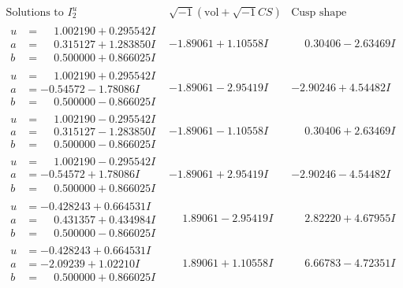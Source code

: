 \documentclass[1p]{elsarticle_modified}
\theoremstyle{definition}
\newcommand{\I}{\sqrt{-1}}
\begin{document}
$$\begin{array}{c|c|c}  
\text{Solutions to }I^u_{2}& \I (\text{vol} + \sqrt{-1}CS) & \text{Cusp shape}\\
 \hline 
\begin{aligned}
u &= \phantom{-}1.002190 + 0.295542 I \\
a &= \phantom{-}0.315127 + 1.283850 I \\
b &= \phantom{-}0.500000 + 0.866025 I\end{aligned}
 & -1.89061 + 1.10558 I & \phantom{-}0.30406 - 2.63469 I \\ \hline\begin{aligned}
u &= \phantom{-}1.002190 + 0.295542 I \\
a &= -0.54572 - 1.78086 I \\
b &= \phantom{-}0.500000 - 0.866025 I\end{aligned}
 & -1.89061 - 2.95419 I & -2.90246 + 4.54482 I \\ \hline\begin{aligned}
u &= \phantom{-}1.002190 - 0.295542 I \\
a &= \phantom{-}0.315127 - 1.283850 I \\
b &= \phantom{-}0.500000 - 0.866025 I\end{aligned}
 & -1.89061 - 1.10558 I & \phantom{-}0.30406 + 2.63469 I \\ \hline\begin{aligned}
u &= \phantom{-}1.002190 - 0.295542 I \\
a &= -0.54572 + 1.78086 I \\
b &= \phantom{-}0.500000 + 0.866025 I\end{aligned}
 & -1.89061 + 2.95419 I & -2.90246 - 4.54482 I \\ \hline\begin{aligned}
u &= -0.428243 + 0.664531 I \\
a &= \phantom{-}0.431357 + 0.434984 I \\
b &= \phantom{-}0.500000 - 0.866025 I\end{aligned}
 & \phantom{-}1.89061 - 2.95419 I & \phantom{-}2.82220 + 4.67955 I \\ \hline\begin{aligned}
u &= -0.428243 + 0.664531 I \\
a &= -2.09239 + 1.02210 I \\
b &= \phantom{-}0.500000 + 0.866025 I\end{aligned}
 & \phantom{-}1.89061 + 1.10558 I & \phantom{-}6.66783 - 4.72351 I \\ \hline\begin{aligned}

\end{aligned}
\end{array}$$
\end{document}
